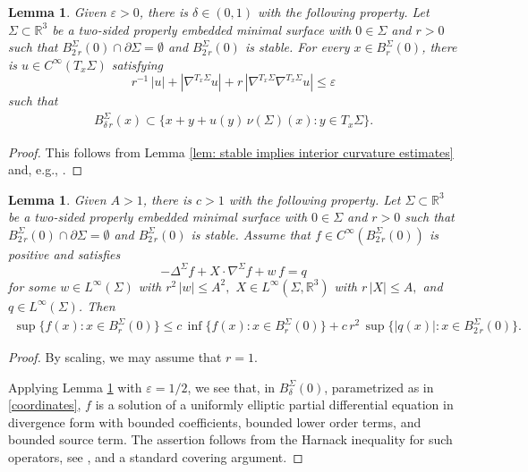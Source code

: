 \documentclass[11pt]{amsart}
\newtheorem{lem}[prop]{Lemma}
\begin{document}
\begin{appendices}
		\begin{lem} \label{lem:stable -> local graphicality}
			Given $\varepsilon>0$, there is $\delta\in(0,1)$ with the following property. Let  $\Sigma\subset \mathbb{R}^3$ be a two-sided properly embedded minimal surface with $0\in  \Sigma$ and $r>0$ such that  $B^\Sigma_{2\,r}(0)\cap \partial \Sigma=\emptyset$ and $B^\Sigma_{2\,r}(0)$ is stable.    For every $x\in B^\Sigma_{r}(0)$, there is  $u\in C^\infty(T_x\Sigma)$ satisfying 
			$$
			r^{-1}\,|u|+|\nabla^{T_x\Sigma}u|+r\,|\nabla^{T_x\Sigma}\nabla^{T_x\Sigma}u|\leq \varepsilon 
			$$
			such that 
			\begin{align} \label{coordinates} B^\Sigma_{\delta\,r}(x)\subset \{x+y+u(y)\,\nu(\Sigma)(x):y\in T_x\Sigma\}.
				\end{align} 
		\end{lem}
		\begin{proof}
		This follows from Lemma \ref{lem: stable implies interior curvature estimates} and, e.g., \cite[Lemma 2.4]{ColdingMinicozzi}.
		\end{proof}

\begin{lem} \label{harnack inequality}
	Given $A>1$, there is $c>1$ with the following property. Let  $\Sigma\subset \mathbb{R}^3$ be a two-sided properly embedded minimal surface with $0\in  \Sigma$ and $r>0$ such that  $B^\Sigma_{2\,r}(0)\cap \partial \Sigma=\emptyset$ and  $B^\Sigma_{2\,r}(0)$ is stable.  Assume that $f\in C^\infty(B^\Sigma_{2\,r}(0))$ is positive and satisfies
	$$-\Delta^\Sigma f+X\cdot \nabla^\Sigma f+w\,f=q$$
	for some $w\in L^\infty(\Sigma)$ with $r^2\,|w|\leq A^2,$ $X\in L^\infty(\Sigma,\mathbb{R}^3)$  with $r\,|X|\leq A,$ and $q\in L^\infty(\Sigma)$.
	 Then 
	\begin{align}
		\sup\{f(x):x\in B^\Sigma_{r}(0)\}\leq c\,\inf \{f(x):x\in B^\Sigma_{r}(0)\}+c\,r^2\,\sup\{|q(x)|:x\in B^\Sigma_{2\,r}(0)\}.
	\end{align} 
\end{lem}
\begin{proof}
	By scaling, we may assume that $r=1$.
	
	 Applying Lemma \ref{lem:stable -> local graphicality} with $\varepsilon=1/2$, we see that, in $B^\Sigma_{\delta}(0)$, parametrized as in \eqref{coordinates},  $f$ is a solution of a uniformly elliptic partial differential equation in divergence form with bounded coefficients, bounded lower order terms, and bounded source term.  
	 The assertion  follows from the Harnack inequality for such operators, see \cite[Theorem 8.17 and Theorem 8.18]{GilbargTrudinger}, and a standard covering argument. 
	 

\end{proof}
\end{appendices}
\end{document}
